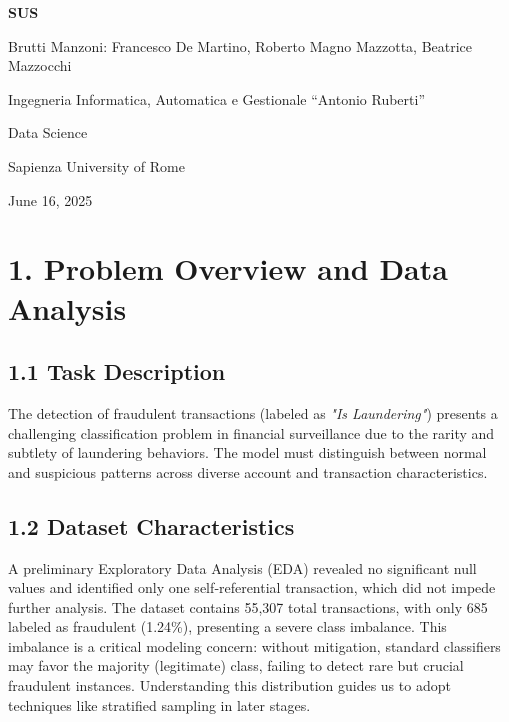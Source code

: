 \documentclass[11pt,twoside,twocolumn]{extarticle}
\begin{document}
\begin{titlepage}
    \centering
    \vspace*{1cm}
    {\huge\bfseries\color{titleblue}SUS\par}
    \vspace{0.5cm}
    {\Large Brutti Manzoni: Francesco De Martino, Roberto Magno Mazzotta, Beatrice Mazzocchi  \\ \par}
    \vspace{1cm}
    {\large Ingegneria Informatica, Automatica e Gestionale ``Antonio Ruberti''\par}
    \vspace{0.2cm}
    {\large Data Science\par}
    \vspace{0.2cm}
    {\large Sapienza University of Rome\par}
    \vspace{2cm}
    {\large June 16, 2025\par}
\end{titlepage}

\section*{1. Problem Overview and Data Analysis}

\subsection*{1.1 Task Description}
The detection of fraudulent transactions (labeled as \textit{"Is Laundering"}) presents a challenging classification problem in financial surveillance due to the rarity and subtlety of laundering behaviors. The model must distinguish between normal and suspicious patterns across diverse account and transaction characteristics.

\subsection*{1.2 Dataset Characteristics}
A preliminary Exploratory Data Analysis (EDA) revealed no significant null values and identified only one self‑referential transaction, which did not impede further analysis. The dataset contains 55,307 total transactions, with only 685 labeled as fraudulent (1.24\%), presenting a severe class imbalance. This imbalance is a critical modeling concern: without mitigation, standard classifiers may favor the majority (legitimate) class, failing to detect rare but crucial fraudulent instances. Understanding this distribution guides us to adopt techniques like stratified sampling in later stages.
\end{document}
